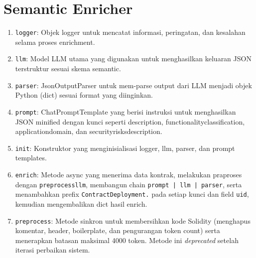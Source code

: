 \chapter{Semantic Enricher}
\label{appendix:semantic-enricher}

\begin{enumerate}
    \item \texttt{logger}: Objek logger untuk mencatat informasi, peringatan, dan kesalahan selama proses enrichment.
    \item \texttt{llm}: Model LLM utama yang digunakan untuk menghasilkan keluaran JSON terstruktur sesuai skema semantic.
    \item \texttt{parser}: JsonOutputParser untuk mem-parse output dari LLM menjadi objek Python (dict) sesuai format yang diinginkan.
    \item \texttt{prompt}: ChatPromptTemplate yang berisi instruksi untuk menghasilkan JSON minified dengan kunci seperti description, functionality\textunderscore classification, application\textunderscore domain, dan security\textunderscore risks\textunderscore description.
    \item \texttt{\textunderscore init\textunderscore }: Konstruktor yang menginisialisasi logger, llm, parser, dan prompt templates.
    \item \texttt{enrich}: Metode async yang menerima data kontrak, melakukan praproses dengan \texttt{preprocess\textunderscore llm}, membangun chain \texttt{prompt | llm | parser}, serta menambahkan prefix \texttt{ContractDeployment.} pada setiap kunci dan field \texttt{uid}, kemudian mengembalikan dict hasil enrich.
    \item \texttt{preprocess}: Metode sinkron untuk membersihkan kode Solidity (menghapus komentar, header, boilerplate, dan pengurangan token count) serta menerapkan batasan maksimal 4000 token. Metode ini \textit{deprecated} setelah iterasi perbaikan sistem.
\end{enumerate}